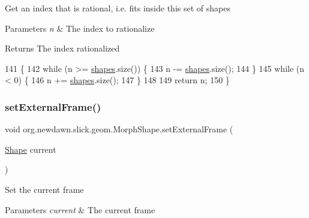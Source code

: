 Get an index that is rational, i.\+e. fits inside this set of shapes


\begin{DoxyParams}{Parameters}
{\em n} & The index to rationalize \\
\hline
\end{DoxyParams}
\begin{DoxyReturn}{Returns}
The index rationalized 
\end{DoxyReturn}

\begin{DoxyCode}
141                                 \{
142         \textcolor{keywordflow}{while} (n >= \mbox{\hyperlink{classorg_1_1newdawn_1_1slick_1_1geom_1_1_morph_shape_a24eb760097e650b268700165c0cd66f2}{shapes}}.size()) \{
143             n -= \mbox{\hyperlink{classorg_1_1newdawn_1_1slick_1_1geom_1_1_morph_shape_a24eb760097e650b268700165c0cd66f2}{shapes}}.size();
144         \}
145         \textcolor{keywordflow}{while} (n < 0) \{
146             n += \mbox{\hyperlink{classorg_1_1newdawn_1_1slick_1_1geom_1_1_morph_shape_a24eb760097e650b268700165c0cd66f2}{shapes}}.size();
147         \}
148         
149         \textcolor{keywordflow}{return} n;
150     \}
\end{DoxyCode}
\mbox{\label{classorg_1_1newdawn_1_1slick_1_1geom_1_1_morph_shape_ac053f4373e6ce3eaecee93d75c0a1260}} 
\subsubsection{\texorpdfstring{set\+External\+Frame()}{setExternalFrame()}}
{\footnotesize\ttfamily void org.\+newdawn.\+slick.\+geom.\+Morph\+Shape.\+set\+External\+Frame (\begin{DoxyParamCaption}\item[{\mbox{\hyperlink{classorg_1_1newdawn_1_1slick_1_1geom_1_1_shape}{Shape}}}]{current }\end{DoxyParamCaption})\hspace{0.3cm}{\ttfamily [inline]}}

Set the current frame


\begin{DoxyParams}{Parameters}
{\em current} & The current frame \\
\hline
\end{DoxyParams}

